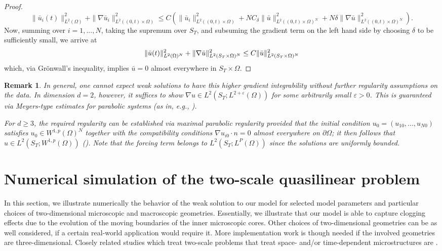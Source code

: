 \documentclass[reqno, 11pt]{amsart}
\newtheorem{rem}[thm]{Remark}
\numberwithin{equation}{section}
\newcommand{\AM}[1]{{\color{brown}#1}}
\newcommand{\e}{\varepsilon}
\newcommand{\clr}{\color{red}}
\begin{document}
\begin{proof}
\begin{equation*}
\|\bar{u}_i(t)\|_{L^2(\Omega)}^2+\|\nabla\bar{u}_i\|_{L^2((0,t)\times\Omega)}^2
\leq C\left(\|\bar{u}_i\|_{L^2((0,t)\times\Omega)}^2
+NC_\delta\|\bar{u}\|^2_{L^{2}((0,t)\times\Omega)^N}+N\delta\|\nabla\bar{u}\|^2_{L^{2}((0,t)\times\Omega)^N}\right).
\end{equation*}
%
Now, summing over $i=1,...,N$, taking the supremum over $S_T$, and subsuming the gradient term on the left hand side by choosing $\delta$ to be sufficiently small, we arrive at
%
\[
\|\bar{u}(t)\|_{L^2(\Omega)^N}^2+\|\nabla\bar{u}\|_{L^2(S_T\times\Omega)^N}^2\\
\leq C\|\bar{u}\|^2_{L^2(S_T\times\Omega)^N}
\]
%
which, via Grönwall's inequality, implies $\bar{u}=0$ almost everywhere in $S_T\times\Omega$.
\end{proof}


\begin{rem}
    In general, one cannot expect weak solutions to have this higher gradient integrability without further regularity assumptions on the data.
    In dimension $d=2$, however, it suffices to show $\nabla u\in L^2(S_T;L^{2+\e}(\Omega))$ for some arbitrarily small $\e>0$.
    This is guaranteed via Meyers-type estimates \cite{meyers_lp-estimate_1963} for parabolic systems (as in, e.g., \cite{tian_lorentz_2017}).

    For $d\ge3$, the required regularity can be established via maximal parabolic regularity provided that the initial condition $u_0=(u_{10},...,u_{N0})$ satisfies $u_0\in W^{1,p}(\Omega)^N$ together with the compatibility conditions $\nabla u_{i0}\cdot n=0$ almost everywhere on $\partial\Omega$; it then follows that $u\in L^2(S_T;W^{1,p}(\Omega))$ (\cite{amann_linear_1995}).
    Note that the forcing term belongs to $L^2(S_T;L^P(\Omega))$ since the solutions are uniformly bounded.
\end{rem}





\section{Numerical simulation of the two-scale quasilinear  problem %
}\label{numerics}
In this section, we illustrate numerically the behavior of the weak solution to our model for selected model parameters and particular choices of two-dimensional microscopic and macroscopic geometries. Essentially, we illustrate that our model is able to capture clogging effects due to the evolution of the moving boundaries of the inner microscopic cores. Other choices of two-dimensional geometries can be as well considered, if a certain real-world application would require it. More implementation work is though needed if the involved geometries are three-dimensional. Closely related studies which treat two-scale problems that treat space- and/or time-dependent  microstructures are \cite{Omar, EdenFreudenbergMuntean2025}.
\end{document}
